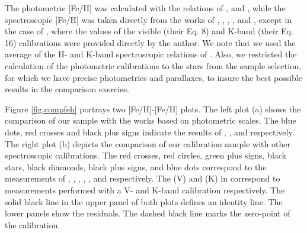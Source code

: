 \documentclass[referee]{aa}
\begin{document}
The photometric [Fe/H] was calculated with the relations of \citet{Bonfils-2005}, \citet{Schlaufman-2010} and \citet{Johnson-2012}, while the spectroscopic [Fe/H] was taken directly from the works of  \citet{Rojas-Ayala-2012}, \citet{Onehag-2012}, \citet{Terrien-2012}, \citet{Newton-2013}, and \citet{Mann-2013b}, except in the case of \citet{Mann-2013a}, where the values of the visible (their Eq. 8) and K-band (their Eq. 16) calibrations were provided directly by the author. We note that we used the average of the H- and K-band spectroscopic relations of \citet{Terrien-2012}. Also, we restricted the calculation of the photometric calibrations to the stars from the sample selection, for which we have precise photometries and parallaxes, to insure the best possible results in the comparison exercise.

Figure \ref{fig:compfeh} portrays two [Fe/H]-[Fe/H] plots. The left plot (a) shows the comparison of our sample with the works based on photometric scales. The blue dots, red crosses and black plus signs indicate the results of \citet{Bonfils-2005}, \citet{Schlaufman-2010}, and \citet{Johnson-2012} respectively. The right plot (b) depicts the comparison of our calibration sample with other spectroscopic calibrations. The red crosses, red circles, green plus signs, black stars, black diamonds, black plus signs, and blue dots correspond to the measurements of \citet{Rojas-Ayala-2012}, \citet{Onehag-2012}, \citet{Terrien-2012}, \citet{Mann-2013a}, \citet{Mann-2013b}, and \citet{Newton-2013} respectively. The (V) and (K) in \citet{Mann-2013a} correspond to measurements performed with a V- and K-band calibration respectively. The solid black line in the upper panel of both plots defines an identity line. The lower panels show the residuals. The dashed black line marks the zero-point of the calibration.
\end{document}
